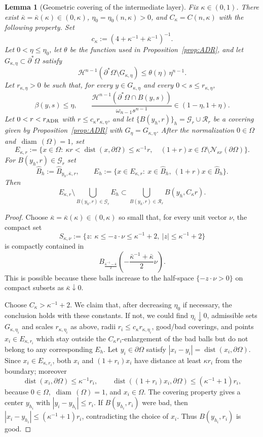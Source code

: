 \documentclass[reqno,11pt]{amsart}
\makeatletter
\def\dist{{\mathop\mathrm{dist}}}
\def\diam{{\mathop\mathrm{\,diam\,}}}
\newtheorem{lem}[thm]{Lemma}%
\numberwithin{equation}{section}
\theoremstyle{remark}
\makeatother
\begin{document}
{
\begin{lem}[Geometric covering of the intermediate layer]\label{lem:flat-cover}
Fix $\kappa\in(0,1)$. There exist $\bar\kappa=\bar\kappa(\kappa)\in(0,\kappa)$, $\eta_0=\eta_0(n,\kappa)>0$, and
$C_\kappa=C(n,\kappa)$ with the following property. Set
\[
c_\kappa:=(4+\kappa^{-1}+\bar\kappa^{-1})^{-1}.
\]
Let $0<\eta\le\eta_0$, let $\theta$ be the function used in Proposition~\ref{prop:ADR}, and let
$G_{\kappa,\eta}\subset\partial^*\Omega$ satisfy
\[
\mathscr H^{n-1}(\partial^*\Omega\setminus G_{\kappa,\eta})\le \theta(\eta)\,\eta^{n-1}.
\]
Let $r_{\kappa,\eta}>0$ be such that, for every
$y\in G_{\kappa,\eta}$ and every $0<s\le r_{\kappa,\eta}$,
\[
\beta(y,s)\le\eta,\qquad 
\frac{\mathscr H^{n-1}(\partial^*\Omega\cap B(y,s))}{\omega_{n-1}s^{n-1}}\in(1-\eta,1+\eta).
\]
Let $0<r<r_{\rm ADR}$ with $r\le c_\kappa r_{\kappa,\eta}$, and let
$\{B(y_h,r)\}_h=\mathcal G_r\cup\mathcal R_r$ be a covering given by Proposition~\ref{prop:ADR} with 
$G_\eta=G_{\kappa,\eta}$.
After the normalization $0\in\Omega$ and $\diam(\Omega)=1$, set
\[
E_{\kappa,r}:=\{x\in\Omega:\ \kappa r<\dist(x,\partial\Omega)\le \kappa^{-1}r,\quad
(1+r)x\in\Omega\setminus\mathcal N_{\kappa r}(\partial\Omega)\}.
\]
For $B(y_h,r)\in\mathcal G_r$ set
\[
\widehat B_h:=\widehat B_{y_h,\bar\kappa,r},\qquad
E_h:=\{x\in E_{\kappa,r}:\ x\in \widehat B_h,\ (1+r)x\in \widehat B_h\}.
\]
Then
\[
E_{\kappa,r}\setminus\bigcup_{B(y_h,r)\in\mathcal G_r}E_h
\subset
\bigcup_{B(y_h,r)\in\mathcal R_r} B(y_h,C_\kappa r).
\]
\end{lem}

\begin{proof}
Choose $\bar\kappa=\bar\kappa(\kappa)\in(0,\kappa)$ so small that, for every unit vector $\nu$, the compact set
\[
S_{\kappa,\nu}:=\bigl\{z:\ \kappa\le -z\cdot\nu\le \kappa^{-1}+2,\ |z|\le \kappa^{-1}+2\bigr\}
\]
is compactly contained in
\[
B_{\frac{\bar\kappa^{-1}-\bar\kappa}{2}}\!\left(-\frac{\bar\kappa^{-1}+\bar\kappa}{2}\nu\right).
\]
This is possible because these balls increase to the half-space $\{-z\cdot\nu>0\}$ on compact subsets as
$\bar\kappa\downarrow0$.

Choose $C_\kappa>\kappa^{-1}+2$. We claim that, after decreasing $\eta_0$ if necessary, the conclusion holds with these
constants. If not, we could find
$\eta_i\downarrow0$, admissible sets $G_{\kappa,\eta_i}$ and scales $r_{\kappa,\eta_i}$ as above, radii
$r_i\le c_\kappa r_{\kappa,\eta_i}$, good/bad coverings, and points
$x_i\in E_{\kappa,r_i}$ which stay outside the $C_\kappa r_i$-enlargement of the bad balls but do not belong to any
corresponding $E_h$. Let $y_i\in\partial\Omega$ satisfy
$|x_i-y_i|=\dist(x_i,\partial\Omega)$. Since $x_i\in E_{\kappa,r_i}$, both $x_i$ and
$(1+r_i)x_i$ have distance at least $\kappa r_i$ from the boundary; moreover
\[
\dist(x_i,\partial\Omega)\le \kappa^{-1}r_i,\qquad
\dist((1+r_i)x_i,\partial\Omega)\le(\kappa^{-1}+1)r_i,
\]
because $0\in\Omega$, $\diam(\Omega)=1$, and $x_i\in\Omega$. The covering property gives a center
$y_{h_i}$ with $|y_i-y_{h_i}|\le r_i$. If $B(y_{h_i},r_i)$ were bad, then
$|x_i-y_{h_i}|\le(\kappa^{-1}+1)r_i$, contradicting the choice of $x_i$.
Thus $B(y_{h_i},r_i)$ is good.


\end{proof}}
\end{document}
